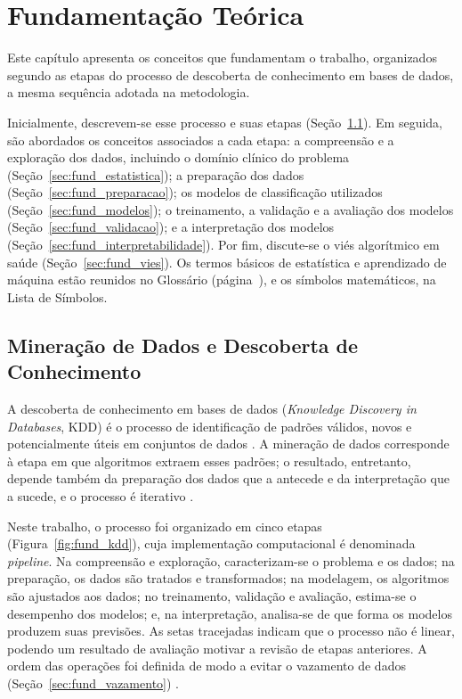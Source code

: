 \chapter{Fundamentação Teórica} \label{cap:fundamentacao}

Este capítulo apresenta os conceitos que fundamentam o trabalho, organizados segundo as etapas do processo de descoberta de conhecimento em bases de dados, a mesma sequência adotada na metodologia.

Inicialmente, descrevem-se esse processo e suas etapas (Seção~\ref{sec:fund_kdd}). Em seguida, são abordados os conceitos associados a cada etapa: a compreensão e a exploração dos dados, incluindo o domínio clínico do problema (Seção~\ref{sec:fund_estatistica}); a preparação dos dados (Seção~\ref{sec:fund_preparacao}); os modelos de classificação utilizados (Seção~\ref{sec:fund_modelos}); o treinamento, a validação e a avaliação dos modelos (Seção~\ref{sec:fund_validacao}); e a interpretação dos modelos (Seção~\ref{sec:fund_interpretabilidade}). Por fim, discute-se o viés algorítmico em saúde (Seção~\ref{sec:fund_vies}). Os termos básicos de estatística e aprendizado de máquina estão reunidos no Glossário (página~\pageref{glossario}), e os símbolos matemáticos, na Lista de Símbolos.

\section{Mineração de Dados e Descoberta de Conhecimento}
\label{sec:fund_kdd}

A descoberta de conhecimento em bases de dados (\textit{Knowledge Discovery in Databases}, KDD) é o processo de identificação de padrões válidos, novos e potencialmente úteis em conjuntos de dados \cite{Fayyad1996KDD}. A mineração de dados corresponde à etapa em que algoritmos extraem esses padrões; o resultado, entretanto, depende também da preparação dos dados que a antecede e da interpretação que a sucede, e o processo é iterativo \cite{Fayyad1996KDD}.

Neste trabalho, o processo foi organizado em cinco etapas (Figura~\ref{fig:fund_kdd}), cuja implementação computacional é denominada \textit{pipeline}. Na compreensão e exploração, caracterizam-se o problema e os dados; na preparação, os dados são tratados e transformados; na modelagem, os algoritmos são ajustados aos dados; no treinamento, validação e avaliação, estima-se o desempenho dos modelos; e, na interpretação, analisa-se de que forma os modelos produzem suas previsões. As setas tracejadas indicam que o processo não é linear, podendo um resultado de avaliação motivar a revisão de etapas anteriores. A ordem das operações foi definida de modo a evitar o vazamento de dados (Seção~\ref{sec:fund_vazamento}) \cite{KaufmanScharRosset2012, KAPOOR2023100804}.

